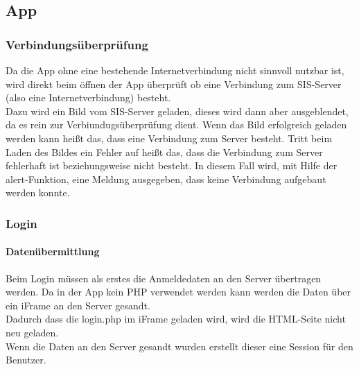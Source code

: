 \subsection{App}

\subsubsection{Verbindungsüberprüfung}

Da die App ohne eine bestehende Internetverbindung nicht sinnvoll nutzbar ist, wird direkt beim öffnen der App überprüft ob eine Verbindung zum SIS-Server (also eine Internetverbindung) besteht.\\
Dazu wird ein Bild vom SIS-Server geladen, dieses wird dann aber ausgeblendet, da es rein zur Verbiundugsüberprüfung dient. Wenn das Bild erfolgreich geladen werden kann heißt das, dass eine Verbindung zum Server besteht. Tritt beim Laden des Bildes ein Fehler auf heißt das, dass die Verbindung zum Server fehlerhaft ist beziehungsweise nicht besteht. In diesem Fall wird, mit Hilfe der alert-Funktion, eine Meldung ausgegeben, dass keine Verbindung aufgebaut  werden konnte.\\



\subsubsection{Login}

\paragraph{Datenübermittlung\\}
Beim Login müssen als erstes die Anmeldedaten an den Server übertragen werden. Da in der App kein PHP verwendet werden kann werden die Daten über ein iFrame an den Server gesandt.\\



Dadurch dass die login.php im iFrame geladen wird, wird die HTML-Seite nicht neu geladen.\\
Wenn die Daten an den Server gesandt wurden erstellt dieser eine Session für den Benutzer.\\

